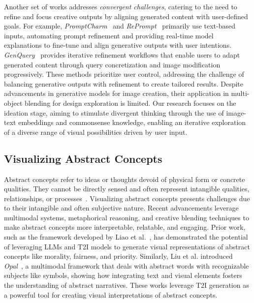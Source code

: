 Another set of works addresses \textit{convergent challenges}, catering to the need to refine and focus creative outputs by aligning generated content with user-defined goals.
For example, \textit{PromptCharm}~\cite{10.1145/3613904.3642803} and \textit{RePrompt}~\cite{10.1145/3544548.3581402} primarily use text-based inputs, automating prompt refinement and providing real-time model explanations to fine-tune and align generative outputs with user intentions.
\textit{GenQuery}~\cite{10.1145/3613904.3642847} provides iterative refinement workflows that enable users to adapt generated content through query concretization and image modification progressively. 
These methods prioritize user control, addressing the challenge of balancing generative outputs with refinement to create tailored results.
Despite advancements in generative models for image creation, their application in multi-object blending for design exploration is limited.
Our research focuses on the ideation stage, aiming to stimulate divergent thinking through the use of image-text embeddings and commonsense knowledge, enabling an iterative exploration of a diverse range of visual possibilities driven by user input.





\subsection{Visualizing Abstract Concepts}



Abstract concepts refer to ideas or thoughts devoid of physical form or concrete qualities. 
They cannot be directly sensed and often represent intangible qualities, relationships, or processes~\cite{Borghi2022}. 
Visualizing abstract concepts presents challenges due to their intangible and often subjective nature.
Recent advancements 
leverage multimodal systems, metaphorical reasoning, and creative blending techniques to make abstract concepts more interpretable, relatable, and engaging.
Prior work, such as the framework developed by Liao et al.~\cite{Liao_Chen_Fu_Du_He_Wang_Han_Zhang_2024}, has demonstrated the potential of leveraging LLMs and T2I models to generate visual representations of abstract concepts like morality, fairness, and priority. Similarly, Liu et al. introduced \textit{Opal}~\cite{10.1145/3526113.3545621}, a multimodal framework that deals with abstract words with recognizable subjects like symbols, showing how integrating text and visual elements fosters the understanding of abstract narratives.
These works leverage T2I generation as a powerful tool for creating visual interpretations of abstract concepts.



